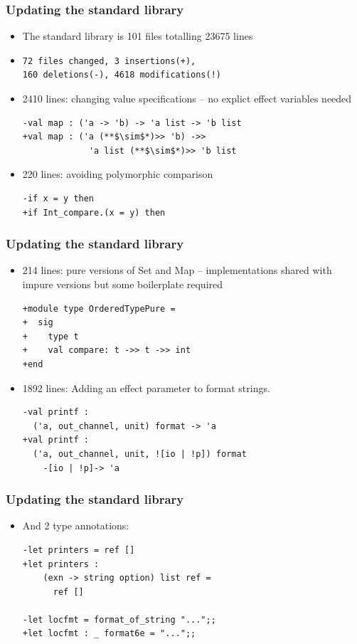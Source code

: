 \documentclass{beamer}
\begin{document}
\begin{frame}[fragile]
\frametitle{Updating the standard library}
\begin{itemize}
\item The standard library is 101 files totalling 23675 lines
\item
\begin{verbatim}
72 files changed, 3 insertions(+),
160 deletions(-), 4618 modifications(!)
\end{verbatim}
\item 2410 lines: changing value specifications -- no explict effect
  variables needed
\begin{lstlisting}[style=ocaml]
-val map : ('a -> 'b) -> 'a list -> 'b list
+val map : ('a (**$\sim$*)>> 'b) ->>
             'a list (**$\sim$*)>> 'b list
\end{lstlisting}
\item 220 lines: avoiding polymorphic comparison
\begin{lstlisting}[style=ocaml]
-if x = y then
+if Int_compare.(x = y) then
\end{lstlisting}
\end{itemize}
\end{frame}

\begin{frame}[fragile]
\frametitle{Updating the standard library}
\begin{itemize}
\item 214 lines: pure versions of Set and Map -- implementations shared
  with impure versions but some boilerplate required
\begin{lstlisting}[style=ocaml]
+module type OrderedTypePure =
+  sig
+    type t
+    val compare: t ->> t ->> int
+end
\end{lstlisting}
\item 1892 lines: Adding an effect parameter to format strings.
\begin{lstlisting}[style=ocaml]
-val printf :
  ('a, out_channel, unit) format -> 'a
+val printf :
  ('a, out_channel, unit, ![io | !p]) format
    -[io | !p]-> 'a
\end{lstlisting}
\end{itemize}
\end{frame}

\begin{frame}[fragile]
\frametitle{Updating the standard library}
\begin{itemize}
\item And 2 type annotations:
\begin{lstlisting}[style=ocaml]
-let printers = ref []
+let printers :
    (exn -> string option) list ref =
      ref []

-let locfmt = format_of_string "...";;
+let locfmt : _ format6e = "...";;
\end{lstlisting}
\end{itemize}
\end{frame}
\end{document}
